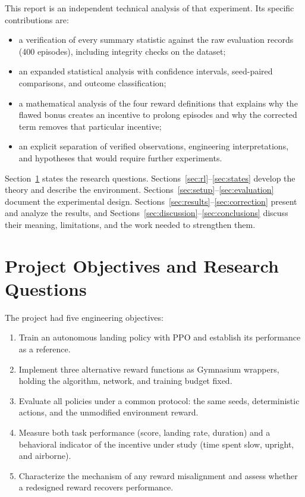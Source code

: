 \documentclass[11pt,a4paper]{article}
\begin{document}
This report is an independent technical analysis of that experiment. Its specific contributions are:
\begin{itemize}
  \item a verification of every summary statistic against the raw evaluation records (400 episodes), including integrity checks on the dataset;
  \item an expanded statistical analysis with confidence intervals, seed-paired comparisons, and outcome classification;
  \item a mathematical analysis of the four reward definitions that explains why the flawed bonus creates an incentive to prolong episodes and why the corrected term removes that particular incentive;
  \item an explicit separation of verified observations, engineering interpretations, and hypotheses that would require further experiments.
\end{itemize}

Section~\ref{sec:objectives} states the research questions. Sections~\ref{sec:rl}--\ref{sec:states} develop the theory and describe the environment. Sections~\ref{sec:setup}--\ref{sec:evaluation} document the experimental design. Sections~\ref{sec:results}--\ref{sec:correction} present and analyze the results, and Sections~\ref{sec:discussion}--\ref{sec:conclusions} discuss their meaning, limitations, and the work needed to strengthen them.

\section{Project Objectives and Research Questions}\label{sec:objectives}

The project had five engineering objectives:
\begin{enumerate}[label=\textbf{O\arabic*.}]
  \item Train an autonomous landing policy with PPO and establish its performance as a reference.
  \item Implement three alternative reward functions as Gymnasium wrappers, holding the algorithm, network, and training budget fixed.
  \item Evaluate all policies under a common protocol: the same seeds, deterministic actions, and the unmodified environment reward.
  \item Measure both task performance (score, landing rate, duration) and a behavioral indicator of the incentive under study (time spent slow, upright, and airborne).
  \item Characterize the mechanism of any reward misalignment and assess whether a redesigned reward recovers performance.
\end{enumerate}
\end{document}

